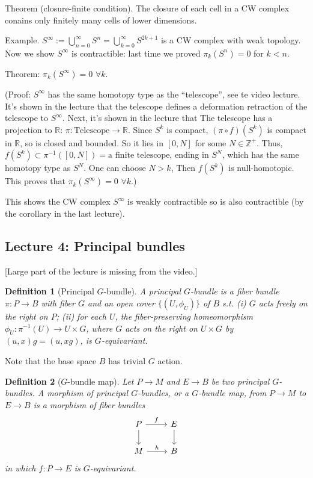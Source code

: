 \documentclass{article}
\theoremstyle{mystyle}
\newtheorem*{definition}{Definition}%
\theoremstyle{remark}
\numberwithin{equation}{section}
\begin{document}
Theorem (closure-finite condition). The closure of each cell in a CW complex conains only finitely many cells of lower dimensions.

Example. $S^\infty:= \bigcup_{n=0}^\infty S^n = \bigcup_{k=0}^\infty S^{2k+1}$  is a CW complex with weak topology. Now we show $S^\infty$ is contractible: last time we proved $\pi_k(S^n) = 0$ for $k<n$. 

Theorem: $\pi_k(S^\infty) = 0$ $\forall k$. 

(Proof: $S^\infty$ has the same homotopy type as the ``telescope'', see te video lecture. It's shown in the lecture that the telescope defines a deformation retraction of the telescope to $S^\infty$. Next, it's shown in the lecture that The telescope has a projection to $\mathbb{R}$: $\pi\colon \text{Telescope}\rightarrow \mathbb{R}$. Since $S^k$ is compact, $(\pi\circ f)(S^k)$ is compact in $\mathbb{R}$, so is closed and bounded. So it lies in $[0,N]$ for some $N\in \mathbb{Z}^+$.  Thus, $f(S^k)\subset \pi^{-1}([0,N]) =\text{a finite telescope}$, ending in $S^N$, which has the same homotopy type as $S^N$. One can choose $N >k$, Then $f(S^k)$ is null-homotopic. This proves that 
$\pi_k(S^\infty) = 0$ $\forall k$.)

This shows the CW complex $S^\infty$ is weakly contractible so is also contractible (by the corollary in the last lecture).


\subsection{Lecture 4: Principal bundles}


[Large part of the lecture is missing from the video.]


\begin{definition}[Principal $G$-bundle] A \emph{principal $G$-bundle} is a fiber bundle $\pi\colon P\rightarrow B$ with fiber $G$ and an open cover $\{(U,\phi_U)\}$ of $B$ s.t. (i) $G$ acts freely on the right on $P$; (ii) for each $U$, the fiber-preserving homeomorphism $\phi_U\colon \pi^{-1}(U)\rightarrow U\times G$, where $G$ acts on the right on $U\times G$ by $(u,x) g=  (u,xg)$, is $G$-equivariant.
\end{definition}

Note that the base space $B$ has trivial $G$ action.

\begin{definition}[$G$-bundle map] Let $P\rightarrow M$ and $E\rightarrow B$ be two principal $G$-bundles. A \emph{morphism} of principal $G$-bundles, or a {$G$-bundle map}, from $P\rightarrow M$ to $E\rightarrow B$ is a morphism of fiber bundles
$$
\begin{tikzcd} P\ar[r,"f"]\ar[d] & E\ar[d]\\M \ar[r,"h"] & B\end{tikzcd}
$$
in which $f\colon P\rightarrow E$ is $G$-equivariant.
\end{definition}
\end{document}
